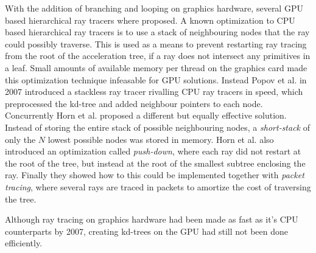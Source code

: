 With the addition of branching and looping on graphics hardware, several GPU
based hierarchical ray tracers where proposed. A known optimization to CPU based
hierarchical ray tracers is to use a stack of neighbouring nodes that the ray
could possibly traverse. This is used as a means to prevent restarting ray
tracing from the root of the acceleration tree, if a ray does not intersect any
primitives in a leaf. Small amounts of available memory per thread on the
graphics card made this optimization technique infeasable for GPU
solutions. Instead Popov et al. in 2007 introduced a
stackless ray tracer rivalling CPU ray tracers in speed, which preprocessed the
kd-tree and added neighbour pointers to each node. Concurrently Horn et
al. proposed a different but equally effective
solution. Instead of storing the entire stack of possible neighbouring nodes, a
\textit{short-stack} of only the $N$ lowest possible nodes was stored in
memory. Horn et al. also introduced an optimization called \textit{push-down},
where each ray did not restart at the root of the tree, but instead at the root
of the smallest subtree enclosing the ray. Finally they showed how to this could
be implemented together with \textit{packet tracing}, where several rays are
traced in packets to amortize the cost of traversing the tree.




Although ray tracing on graphics hardware had been made as fast as
it's CPU counterparts by 2007, creating kd-trees on the GPU had still
not been done efficiently.


